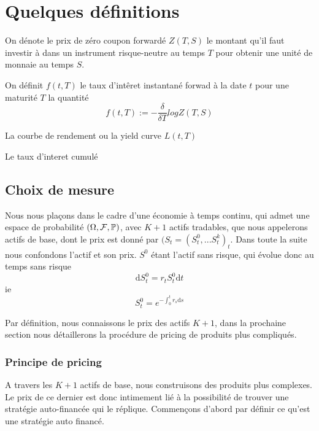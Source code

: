 

\section{Quelques définitions}


\begin{defn}
On dénote le prix de zéro coupon forwardé $Z(T, S)$ le montant qu'il faut investir à dans un instrument risque-neutre au temps $T$ pour obtenir une unité de monnaie au temps $S$.
\end{defn}

\begin{defn}
On définit $f(t, T)$ le taux d'intêret instantané forwad à la date $t$ pour une maturité $T$ la quantité $$f(t, T) := - \frac{ \delta}{\delta T}  log Z(T, S)$$
\end{defn}
\begin{defn}
La courbe de rendement ou la yield curve $L(t, T)$
\end{defn}
\begin{defn}
Le taux d'interet cumulé
\end{defn}

\subsection{Choix de mesure}

Nous nous plaçons dans le cadre d'une économie à temps continu, qui admet une espace de probabilité $(\Omega, \cal{F}, \mathbb{P})$, avec $K+1$ actifs tradables, que nous appelerons actifs de base, dont le prix est donné par $(S_t = (S^0_t, ...S^k_t)_t$. Dans toute la suite nous confondons l'actif et son prix.
$S^0$ étant l'actif sans risque, qui évolue donc au temps sans risque $$\mathrm{d}S^0_t = r_t S^0_t \mathrm{d}t$$
ie $$S^0_t = e^{-\int_0^t r_s \mathrm{d}s}$$

Par définition, nous connaissons le prix des actifs $K+1$, dans la prochaine section nous détaillerons la procédure de pricing de produits plus compliqués.



\subsubsection{Principe de pricing}
A travers les $K+1$ actifs de base, nous construisons des produits plus complexes. 
Le prix de ce dernier est donc intimement lié à la possibilité de trouver une stratégie auto-financée qui le réplique.
Commençons d'abord par définir ce qu'est une stratégie auto financé.

